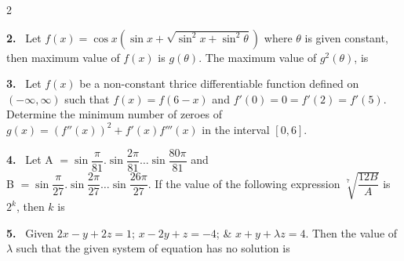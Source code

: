 \documentclass[10pt]{extarticle}
\newcommand{\qn}[1]{\par\smallskip\noindent\textbf{#1.}~}
\begin{document}
\begin{multicols}{2}
\qn{2} Let $f(x)=\cos x\left(\sin x+\sqrt{\sin^2x+\sin^2\theta}\right)$ where $\theta$ is given constant, then maximum value of $f(x)$ is $g(\theta)$. The maximum value of $g^2(\theta)$, is

\qn{3} Let $f(x)$ be a non-constant thrice differentiable function defined on $(-\infty,\infty)$ such that $f(x)=f(6-x)$ and $f'(0)=0=f'(2)=f'(5)$. Determine the minimum number of zeroes of $g(x)=\left(f''(x)\right)^2+f'(x)f'''(x)$ in the interval $[0,6]$.

\qn{4} Let A $=\sin\dfrac\pi{81}.\sin\dfrac{2\pi}{81}\dots\sin\dfrac{80\pi}{81}$ and\\
B $=\sin\dfrac\pi{27}.\sin\dfrac{2\pi}{27}\dots\sin\dfrac{26\pi}{27}$. If the value of the following expression $\sqrt[7]{\dfrac{12B}A}$ is $2^k$, then $k$ is

\qn{5} Given $2x-y+2z=1$; $x-2y+z=-4$; \& $x+y+\lambda z=4$. Then the value of $\lambda$ such that the given system of equation has no solution is

\end{multicols}
\end{document}
